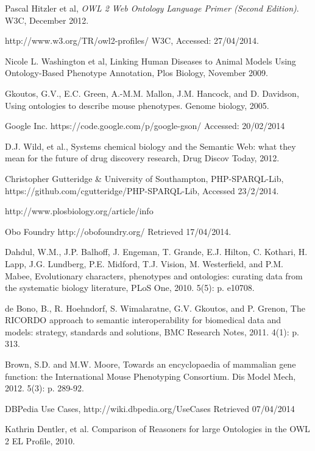 \documentclass{article}
\begin{document}
\begin{thebibliography}{9}
  Pascal Hitzler et al,
  \emph{OWL 2 Web Ontology Language Primer (Second Edition)}.
  W3C,
  December 2012.

  http://www.w3.org/TR/owl2-profiles/
  W3C,
  Accessed: 27/04/2014.

  Nicole L. Washington et al,
  Linking Human Diseases to Animal Models Using Ontology-Based Phenotype Annotation,
  Plos Biology,
  November 2009.

  Gkoutos, G.V., E.C. Green, A.-M.M. Mallon, J.M. Hancock, and D. Davidson,
  Using ontologies to describe mouse phenotypes. 
  Genome biology, 
  2005.

  Google Inc.
  https://code.google.com/p/google-gson/
  Accessed: 20/02/2014

  D.J. Wild, et al.,
  Systems chemical biology and the Semantic Web: what they mean for the future of drug discovery research,
  Drug Discov Today,
  2012.

  Christopher Gutteridge & University of Southampton,
  PHP-SPARQL-Lib,
  https://github.com/cgutteridge/PHP-SPARQL-Lib,
  Accessed 23/2/2014.

http://www.plosbiology.org/article/info%

  Obo Foundry
  http://obofoundry.org/
  Retrieved 17/04/2014.

  Dahdul, W.M., J.P. Balhoff, J. Engeman, T. Grande, E.J. Hilton, C. Kothari, H. Lapp, J.G. Lundberg, P.E. Midford, T.J. Vision, M. Westerfield, and P.M. Mabee, 
  Evolutionary characters, phenotypes and ontologies: curating data from the systematic biology literature,
  PLoS One,
  2010. 5(5): p. e10708.

  de Bono, B., R. Hoehndorf, S. Wimalaratne, G.V. Gkoutos, and P. Grenon, 
  The RICORDO approach to semantic interoperability for biomedical data and models: strategy, standards
and solutions, 
  BMC Research Notes, 
  2011. 4(1): p. 313.

  Brown, S.D. and M.W. Moore,
  Towards an encyclopaedia of mammalian gene function: the International Mouse Phenotyping Consortium. 
  Dis Model Mech, 
  2012. 5(3): p. 289-92.

  DBPedia Use Cases,
  http://wiki.dbpedia.org/UseCases
  Retrieved 07/04/2014

  Kathrin Dentler, et al.
  Comparison of Reasoners for large Ontologies in the OWL 2 EL Profile,
  2010.


\end{thebibliography}
\end{document}
